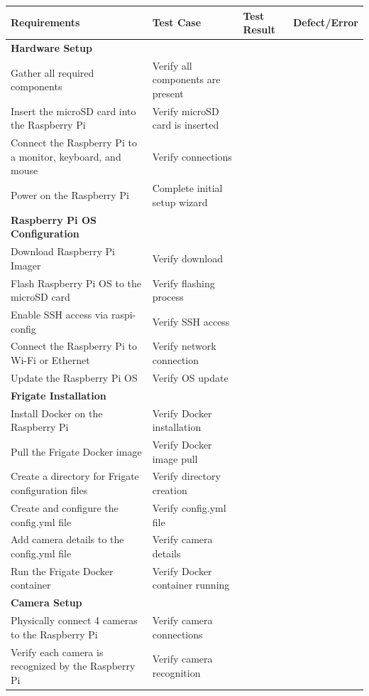 \documentclass{report}
\begin{document}
\begin{longtable}{|p{3cm}|p{3cm}|p{3cm}|p{3cm}|}
\hline
\textbf{Requirements} & \textbf{Test Case} & \textbf{Test Result} & \textbf{Defect/Error}\\
\hline
\textbf{Hardware Setup} &  &  &  \\
\hline
Gather all required components & Verify all components are present &  &  \\
\hline
Insert the microSD card into the Raspberry Pi & Verify microSD card is inserted &  &  \\
\hline
Connect the Raspberry Pi to a monitor, keyboard, and mouse & Verify connections &  &  \\
\hline
Power on the Raspberry Pi & Complete initial setup wizard &  &  \\
\hline
\textbf{Raspberry Pi OS Configuration} &  &  &  \\
\hline
Download Raspberry Pi Imager & Verify download &  &  \\
\hline
Flash Raspberry Pi OS to the microSD card & Verify flashing process &  &  \\
\hline
Enable SSH access via raspi-config & Verify SSH access &  &  \\
\hline
Connect the Raspberry Pi to Wi-Fi or Ethernet & Verify network connection &  &  \\
\hline
Update the Raspberry Pi OS & Verify OS update &  &  \\
\hline
\textbf{Frigate Installation} &  &  &  \\
\hline
Install Docker on the Raspberry Pi & Verify Docker installation &  &  \\
\hline
Pull the Frigate Docker image & Verify Docker image pull &  &  \\
\hline
Create a directory for Frigate configuration files & Verify directory creation &  &  \\
\hline
Create and configure the config.yml file & Verify config.yml file &  &  \\
\hline
Add camera details to the config.yml file & Verify camera details &  &  \\
\hline
Run the Frigate Docker container & Verify Docker container running &  &  \\
\hline
\textbf{Camera Setup} &  &  &  \\
\hline
Physically connect 4 cameras to the Raspberry Pi & Verify camera connections &  &  \\
\hline
Verify each camera is recognized by the Raspberry Pi & Verify camera recognition &  &  \\

\end{longtable}
\end{document}
